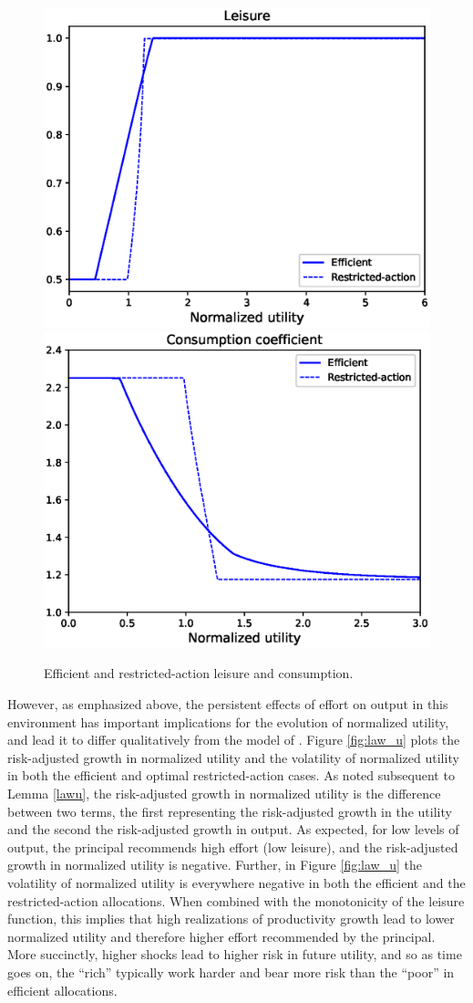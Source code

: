 \documentclass[11pt]{article}
\theoremstyle{plain}
\begin{document}
\begin{figure}[!htb]
\centering
\includegraphics[width=0.49\linewidth]{leisure_ex}
\includegraphics[width=0.49\linewidth]{consumption_ex}
\caption{Efficient and restricted-action leisure and consumption.}\label{fig:l_c}
\end{figure}

However, as emphasized above, the persistent effects of effort on output in this environment has important implications for the evolution of normalized utility, and lead it to differ qualitatively from the model of \cite{sannikov_continuous-time_2008}. Figure \ref{fig:law_u} plots the risk-adjusted growth in normalized utility and the volatility of normalized utility in both the efficient and optimal restricted-action cases. As noted subsequent to Lemma \ref{lawu}, the risk-adjusted growth in normalized utility is the difference between two terms, the first representing the risk-adjusted growth in the utility and the second the risk-adjusted growth in output. As expected, for low levels of output, the principal recommends high effort (low leisure), and the risk-adjusted growth in normalized utility is negative. Further, in Figure \ref{fig:law_u} the volatility of normalized utility is everywhere negative in both the efficient and the restricted-action allocations. When combined with the monotonicity of the leisure function, this implies that high realizations of productivity growth lead to lower normalized utility and therefore higher effort recommended by the principal. More succinctly, higher shocks lead to higher risk in future utility, and so as time goes on, the ``rich'' typically work harder and bear more risk than the ``poor'' in efficient allocations. 
\end{document}
